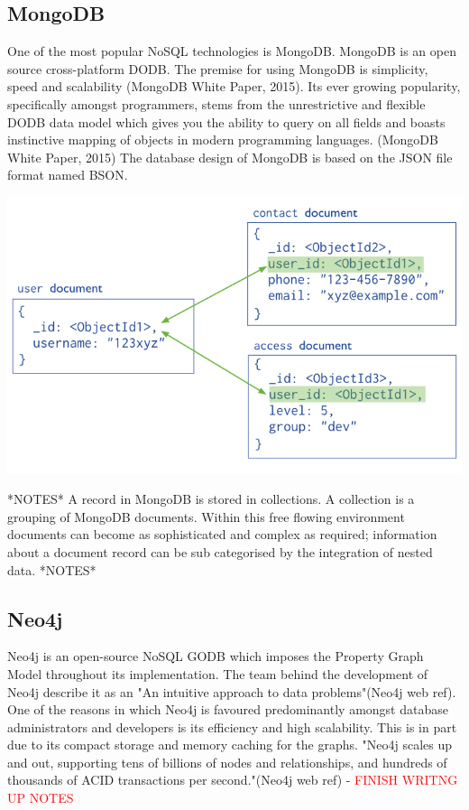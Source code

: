\subsection{MongoDB}\label{mongo}
One of the most popular NoSQL technologies is MongoDB. MongoDB is an open source cross-platform DODB. The premise for using MongoDB is simplicity, speed and scalability (MongoDB White Paper, 2015). Its ever growing popularity, specifically amongst programmers, stems from the unrestrictive and flexible DODB data model which gives you the ability to query on all fields and boasts instinctive mapping of objects in modern programming languages. (MongoDB White Paper, 2015) The database design of MongoDB is based on the JSON file format named BSON. \begin{center}\includegraphics[width=1\linewidth]{images/mongodbmodel}\end{center}

*NOTES* A record in MongoDB is stored in collections. A collection is a grouping of MongoDB documents.
Within this free flowing environment documents can become as sophisticated and complex as required; information about a document record can be sub categorised by the integration of nested data. *NOTES*

\subsection{Neo4j}\label{neo}
Neo4j is an open-source NoSQL GODB which imposes the Property Graph Model throughout its implementation. The team behind the development of Neo4j describe it as an "An intuitive approach to data problems"(Neo4j web ref). One of the reasons in which Neo4j is favoured predominantly amongst database administrators and developers is its efficiency and high scalability. This is in part due to its compact storage and memory caching for the graphs. "Neo4j scales up and out, supporting tens of billions of nodes and relationships, and hundreds of thousands of ACID transactions per second."(Neo4j web ref) -\textcolor{red}{ FINISH WRITNG UP NOTES}


